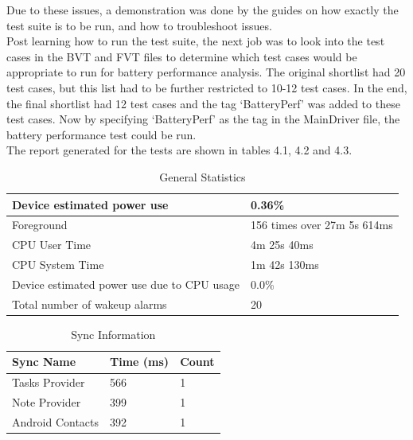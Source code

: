 Due to these issues, a demonstration was done by the guides on how exactly the test suite is to be run, and how to troubleshoot issues. \\

Post learning how to run the test suite, the next job was to look into the test cases in the BVT and FVT files to determine which test cases would be appropriate to run for battery performance analysis. The original shortlist had 20 test cases, but this list had to be further restricted to 10-12 test cases. In the end, the final shortlist had 12 test cases and the tag `BatteryPerf' was added to these test cases. Now by specifying `BatteryPerf' as the tag in the MainDriver file, the battery performance test could be run.\\

The report generated for the tests are shown in tables 4.1, 4.2 and 4.3.

\begin{table}[!h]
\begin{center}
\caption{General Statistics}
\label{my-label}
\begin{tabular}{|P{8cm}|P{6.5cm}|}
\hline
Device estimated power use                  & 0.36\%                      \\ \hline
Foreground                                  & 156 times over 27m 5s 614ms \\ \hline
CPU User Time                               & 4m 25s 40ms                 \\ \hline
CPU System Time                             & 1m 42s 130ms                \\ \hline
Device estimated power use due to CPU usage & 0.0\%                       \\ \hline
Total number of wakeup alarms               & 20     \\    \hline                
\end{tabular}
\end{center}
\end{table}

\begin{table}[!h]
\begin{center}
\caption{Sync Information}
\label{my-label}
\begin{tabular}{|P{4cm}|P{4cm}|P{4cm}|}
\hline
Sync Name        & Time (ms) & Count \\ \hline
Tasks Provider   & 566       & 1     \\ \hline
Note Provider    & 399       & 1     \\ \hline
Android Contacts & 392       & 1    \\ \hline
\end{tabular}
\end{center}
\end{table}
\pagebreak

